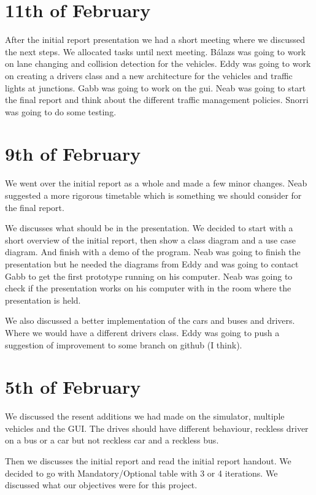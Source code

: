 \documentclass[11pt]{article}
\begin{document}
\section{11th of February}
After the initial report presentation we had a short meeting where we discussed the next steps. We allocated tasks until next meeting. Bálazs was going to work on lane changing and collision detection for the vehicles. Eddy was going to work on creating a drivers class and a new architecture for the vehicles and traffic lights at junctions. Gabb was going to work on the gui. Neab was going to start the final report and think about the different traffic management policies. Snorri was going to do some testing. 

\section{9th of February}
We went over the initial report as a whole and made a few minor changes. Neab suggested a more rigorous timetable which is something we should consider for the final report.

We discusses what should be in the presentation. We decided to start with a short overview of the initial report, then show a class diagram and a use case diagram. And finish with a demo of the program. Neab was going to finish the presentation but he needed the diagrams from Eddy and was going to contact Gabb to get the first prototype running on his computer. Neab was going to check if the presentation works on his computer with in the room where the presentation is held.

We also discussed a better implementation of the cars and buses and drivers. Where we would have a different drivers class. Eddy was going to push a suggestion of improvement to some branch on github (I think).

\section{5th of February}
We discussed the resent additions we had made on the simulator, multiple vehicles and the GUI. The drives should have different behaviour, reckless driver on a bus or a car but not reckless car and a reckless bus.

Then we discusses the initial report and read the initial report handout. We decided to go with Mandatory/Optional table with 3 or 4 iterations. We discussed what our objectives were for this project.
\end{document}

